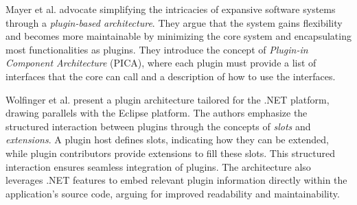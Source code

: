 \documentclass[
  a4paper,  %
  twoside,  %
  bibliography=totoc,
  headsepline,
  cleardoublepage=empty,
  parskip=half,
  draft=false
]{scrbook}
\begin{document}
Mayer et al. \cite{Mayer_2003} advocate simplifying the intricacies of expansive software systems through a \emph{plugin-based architecture}.
They argue that the system gains flexibility and becomes more maintainable by minimizing the core system and encapsulating most functionalities as plugins.
They introduce the concept of \emph{Plugin-in Component Architecture} (PICA), where each plugin must provide a list of interfaces that the core can call and a description of how to use the interfaces.

Wolfinger et al. \cite{Wolfinger2006} present a plugin architecture tailored for the .NET platform, drawing parallels with the Eclipse platform.
The authors emphasize the structured interaction between plugins through the concepts of \emph{slots} and \emph{extensions}.
A plugin host defines slots, indicating how they can be extended, while plugin contributors provide extensions to fill these slots.
This structured interaction ensures seamless integration of plugins.
The architecture also leverages .NET features to embed relevant plugin information directly within the application's source code, arguing for improved readability and maintainability.
\end{document}
